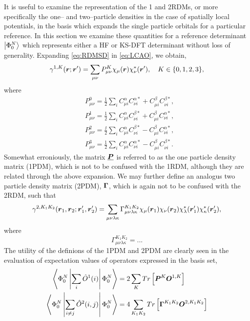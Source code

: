 It is useful to examine the representation of the 1 and 2RDMs, or more specifically the one-- and two--particle
densities in the case of spatially local potentials, in the basis which expands the single particle orbitals
for a particular reference. In this section we examine these quantities for a reference determinant $\left\vert \Phi_0^N \right\rangle$
which represents either a HF or KS-DFT determinant without loss of generality.  
Expanding \cref{eq:RDMSD} in \cref{eq:LCAO}, we obtain,
\begin{equation}
  \gamma^{1,K}(\boldsymbol{r}; \boldsymbol{r}') = \sum_{\mu\nu} P_{\mu\nu}^{K} \chi_\mu(\boldsymbol{r}) \chi^*_\nu(\boldsymbol{r}'), \quad K \in \{0,1,2,3\},
\end{equation}
where
\begin{subequations}
\begin{align}
  &P^{0}_{\mu\nu} = \frac{1}{2}   \sum_i C_{\mu i}^\alpha C_{\nu i}^{\alpha *} + C_{\mu i}^\beta  C_{\nu i}^{\beta  *},\\
  &P^{1}_{\mu\nu} = \frac{1}{2}   \sum_i C_{\mu i}^\alpha C_{\nu i}^{\beta  *} + C_{\mu i}^\beta  C_{\nu i}^{\alpha *},\\
  &P^{2}_{\mu\nu} = \frac{\ii}{2} \sum_i C_{\mu i}^\alpha C_{\nu i}^{\beta  *} - C_{\mu i}^\beta  C_{\nu i}^{\alpha *},\\
  &P^{3}_{\mu\nu} = \frac{1}{2}   \sum_i C_{\mu i}^\alpha C_{\nu i}^{\alpha *} - C_{\mu i}^\beta  C_{\nu i}^{\beta  *}.
\end{align}
\end{subequations}
Somewhat erroniously, the matrix $\boldsymbol{\underline{P}}$ is referred to as the one particle density matrix (1PDM), which is not to be
confused with the 1RDM, although they are related through the above expansion. We may further define an analogus two
particle density matrix (2PDM), $\boldsymbol{\Gamma}$, which is again not to be confused with the 2RDM, such that 
\begin{equation}
  \gamma^{2,K_1K_2}(\boldsymbol{r}_1, \boldsymbol{r}_2; \boldsymbol{r}'_1, \boldsymbol{r}'_2) = 
    \sum_{\mu\nu\lambda\kappa} \Gamma^{K_1K_2}_{\mu\nu\lambda\kappa} 
      \chi_\mu(\boldsymbol{r}_1) \chi_\nu(\boldsymbol{r}_2) \chi^*_\lambda(\boldsymbol{r}'_1) \chi^*_\kappa(\boldsymbol{r}'_2), 
\end{equation}
where 
\begin{equation}
  \Gamma^{K_1 K_2}_{\mu\nu\lambda\kappa} = ...
\end{equation}
The utility of the definions of the 1PDM and 2PDM  are clearly seen in the evaluation of expectation values
of operators expressed in the basis set,
\begin{align}
  \label{eq:BasisDenMatInner}
  \left\langle \Phi^N_0 \left\vert \sum_i \hat{O}^1(i) \right\vert \Phi^N_0 \right\rangle &= 2\sum_K Tr \left[ \boldsymbol{P}^K \boldsymbol{O}^{1,K} \right] \\
  \left\langle \Phi^N_0 \left\vert \sum_{i\neq j} \hat{O}^2(i,j) \right\vert \Phi^N_0 \right\rangle &= 4\sum_{K_1K_2} Tr \left[ \boldsymbol{\Gamma}^{K_1K_2} \boldsymbol{O}^{2,K_1K_2} \right]
\end{align}

